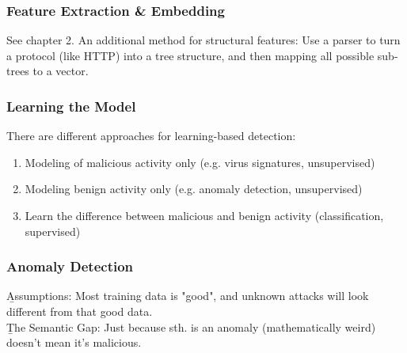 \subsubsection{Feature Extraction \& Embedding}
See chapter 2. An additional method for structural features: Use a parser to turn a protocol (like HTTP) into a tree structure, and then mapping all possible sub-trees to a vector.

\subsubsection{Learning the Model}
There are different approaches for learning-based detection:
\begin{enumerate}
    \item Modeling of malicious activity only (e.g. virus signatures, unsupervised)
    \item Modeling benign activity only (e.g. anomaly detection, unsupervised)
    \item Learn the difference between malicious and benign activity (classification, supervised)
\end{enumerate}

\subsubsection{Anomaly Detection}
\b{Assumptions:} Most training data is "good", and unknown attacks will look different from that good data.\\

\b{The Semantic Gap:} Just because sth. is an anomaly (mathematically weird) doesn't mean it's malicious.

